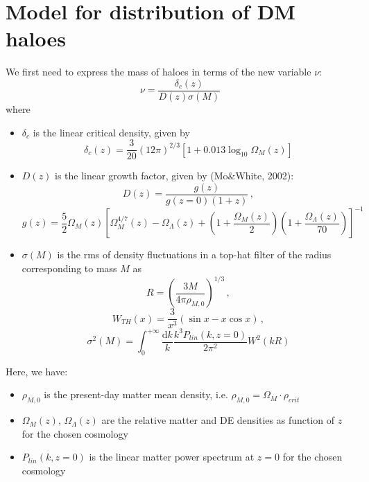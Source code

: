 \documentclass[10pt,a4paper]{article}
\begin{document}
\section{Model for distribution of DM haloes}

We first need to express the mass of haloes in terms of the new variable $\nu$:
\begin{equation}
\nu = \frac{\delta_c(z)}{D(z)\sigma(M)}
\end{equation}
where
\begin{itemize}
\item $\delta_c$ is the linear critical density, given by
\begin{equation}
\delta_c(z) = \frac{3}{20} \left(12\pi\right)^{2/3} \left[ 1 + 0.013 \log_{10} \Omega_M(z)\right]
\end{equation}
\item $D(z)$ is the linear growth factor, given by (Mo\&White, 2002):
\begin{equation}
D(z) = \frac{g(z)}{g(z=0)(1+z)} \, ,
\end{equation}
\begin{equation}
g(z) = \frac{5}{2}\Omega_M(z) \left[ \Omega_M^{4/7}(z) - \Omega_{\Lambda}(z) + \left(1 + \frac{\Omega_M(z)}{2}\right)\left(1 + \frac{\Omega_{\Lambda}(z)}{70}\right)\right]^{-1}
\end{equation}
\item $\sigma(M)$ is the rms of density fluctuations in a top-hat filter of the radius corresponding to mass $M$ as
\begin{equation}
R = \left(\frac{3M}{4\pi \rho_{M,0}}\right)^{1/3} \, ,
\end{equation}
\begin{equation}
W_{TH}(x) = \frac{3}{x^3} \left( \sin x - x \cos x \right) \, ,
\end{equation}
\begin{equation}
\sigma^2(M) = \int_0^{+\infty} \frac{\mathrm{d}k}{k} \frac{k^3 P_{lin}(k, z=0)}{2\pi^2} W^2(kR)
\end{equation}
\end{itemize}

Here, we have:
\begin{itemize}
\item $\rho_{M,0}$ is the present-day matter mean density, i.e. $\rho_{M,0} = \Omega_M \cdot \rho_{crit}$
\item $\Omega_M(z)$, $\Omega_{\Lambda}(z)$ are the relative matter and DE densities as function of $z$ for the chosen cosmology
\item $P_{lin}(k, z=0)$ is the linear matter power spectrum at $z=0$ for the chosen cosmology
\end{itemize}
\end{document}
